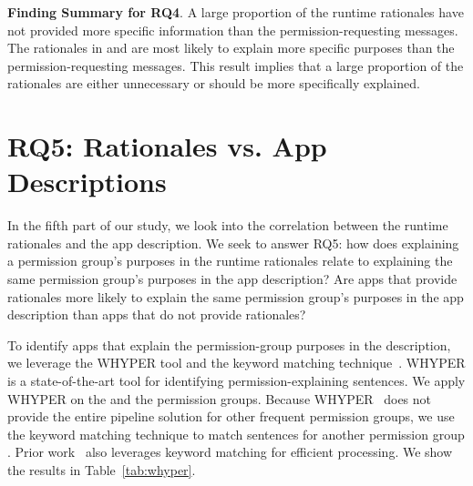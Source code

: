 {\bf Finding Summary for RQ4}. A large proportion of the runtime rationales have not provided more specific information than the permission-requesting messages. 
The rationales in  and  are most likely to explain more specific purposes than the permission-requesting messages. This result implies that a large proportion of the rationales are either unnecessary or should be more specifically explained. 



\section{RQ5: Rationales vs. App Descriptions}
\label{sec:rq5}

In the fifth part of our study, we look into the correlation between the runtime rationales and the app description. 
We seek to answer RQ5: how does explaining a permission group's purposes in the runtime rationales relate to explaining the same permission group's purposes in the app description? 
Are apps that provide rationales more likely to explain the same permission group's purposes in the app description than apps that do not provide rationales? 

To identify apps that explain the permission-group purposes in the description, we leverage the WHYPER tool and the keyword matching technique~\cite{conf/uss/PanditaXYEX13}. 
WHYPER is a state-of-the-art tool for identifying permission-explaining sentences. 
We apply WHYPER on the  and the  permission groups. 
Because WHYPER~\cite{whypertool} does not provide the entire pipeline solution for other frequent permission groups, we use the keyword matching technique to match sentences for another permission group . 
Prior work~\cite{clap} also leverages keyword matching for efficient processing.
We show the results in Table~\ref{tab:whyper}.

